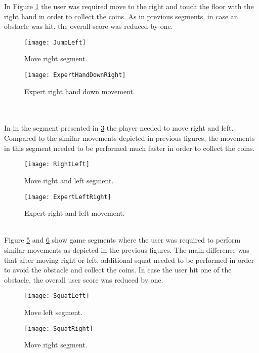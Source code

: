 In Figure \ref{fig:jumpright} the user was required move to the right and touch the floor with the right hand in order to collect the coins. As in previous segments, in case an obstacle was hit, the overall score was reduced by one.\\
\begin{figure}[h]
    \centering
    \texttt{[image: JumpLeft]}
    \caption{Move right segment.}
    \label{fig:jumpright}
\end{figure}
\begin{figure}[h]
    \centering
    \texttt{[image: ExpertHandDownRight]}
    \caption{Expert right hand down movement.}
    \label{fig:expertLeftDown}
\end{figure}\\\\
In in the segment presented in \ref{fig:rightleft} the player needed to move right and left. Compared to the similar movements depicted in previous figures, the movements in this segment needed to be performed much faster in order to collect the coins.\\ 
\begin{figure}[h]
    \centering
    \texttt{[image: RightLeft]}
    \caption{Move right and left segment.}
    \label{fig:rightleft}
\end{figure}
\begin{figure}[h]
    \centering
    \texttt{[image: ExpertLeftRight]}
    \caption{Expert right and left movement.}
    \label{fig:expertLeftRight}
\end{figure}\\
Figure \ref{fig:squatleft} and \ref{fig:squatright} show game segments where the user was required to perform similar movements as depicted in the previous figures. The main difference was that after moving right or left, additional squat needed to be performed in order to avoid the obstacle and collect the coins. In case the user hit one of the obstacle, the overall user score was reduced by one.\\
\begin{figure}[h]
    \centering
    \texttt{[image: SquatLeft]}
    \caption{Move left segment.}
    \label{fig:squatleft}
\end{figure}
\begin{figure}[h]
    \centering
    \texttt{[image: SquatRight]}
    \caption{Move right segment.}
    \label{fig:squatright}
\end{figure}\\

